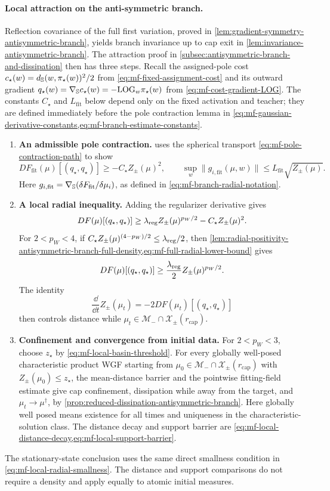 \paragraph{Local attraction on the anti-symmetric branch.}
Reflection covariance of the full first variation, proved in
\cref{lem:gradient-symmetry-antisymmetric-branch}, yields branch invariance
up to cap exit in \cref{lem:invariance-antisymmetric-branch}.
The attraction proof in
\cref{subsec:antisymmetric-branch-and-dissipation} then has three steps.
Recall the assigned-pole cost \(c_\star(w)=d_{\mathbb{S}}(w,\pi_\star(w))^2/2\)
from \cref{eq:mf-fixed-assignment-cost} and its outward gradient
\(q_\star(w)=\nabla_{\mathbb{S}} c_\star(w)=-\mathrm{LOG}_w\pi_\star(w)\) from
\cref{eq:mf-cost-gradient-LOG}.
The constants \(C_\star\) and \(L_{\mathrm{fit}}\) below depend only on the
fixed activation and teacher; they are defined immediately before the pole
contraction lemma in
\cref{eq:mf-gaussian-derivative-constants,eq:mf-branch-estimate-constants}.
\begin{enumerate}
 \item \textbf{An admissible pole contraction.}
  uses the spherical transport
 \cref{eq:mf-pole-contraction-path} to show
 \[
 DF_{\mathrm{fit}}(\mu)[(q_\star,q_\star)]\ge-C_\star Z_\pm(\mu)^2,
 \qquad \sup_w\|g_{i,\mathrm{fit}}(\mu,w)\|
                 \le L_{\mathrm{fit}}\sqrt{Z_\pm(\mu)}.
 \]
 Here \(g_{i,\mathrm{fit}}=\nabla_{\mathbb{S}}(\delta F_{\mathrm{fit}}/\delta\mu_i)\),
 as defined in \cref{eq:mf-branch-radial-notation}.
 \item \textbf{A local radial inequality.}
 Adding the regularizer derivative gives
 \[
 DF(\mu)[(q_\star,q_\star)]
 \ge\lambda_{\mathrm{reg}} Z_\pm(\mu)^{p_W/2}-C_\star Z_\pm(\mu)^2.
 \]
 For \(2<p_W<4\), if
 \(C_\star Z_\pm(\mu)^{(4-p_W)/2}\le\lambda_{\mathrm{reg}}/2\), then
 \cref{lem:radial-positivity-antisymmetric-branch-full-density,eq:mf-full-radial-lower-bound}
 gives
 \[
 DF(\mu)[(q_\star,q_\star)]
 \ge\frac{\lambda_{\mathrm{reg}}}{2}Z_\pm(\mu)^{p_W/2}.
 \]
 The identity
 \[
 \frac{\dd}{\dd t}Z_\pm(\mu_t)=-2DF(\mu_t)[(q_\star,q_\star)]
 \]
 then controls distance while \(\mu_t\in\mathcal M_-\cap
 \mathcal X_\pm(r_{\mathrm{cap}})\).
 \item \textbf{Confinement and convergence from initial data.}
 For \(2<p_W<3\), choose \(z_\star\) by
 \cref{eq:mf-local-basin-threshold}. For every globally well-posed
 characteristic product WGF starting from
 \(\mu_0\in\mathcal M_-\cap\mathcal X_\pm(r_{\mathrm{cap}})\) with
 \(Z_\pm(\mu_0)\le z_\star\), the mean-distance barrier and the pointwise
 fitting-field estimate give cap confinement, dissipation while away from the
 target, and \(\mu_t\to\mu^\dagger\), by
 \cref{prop:reduced-dissipation-antisymmetric-branch}.
 Here globally well posed means existence for all times and uniqueness in the
 characteristic-solution class.
 The distance decay and support barrier are
 \cref{eq:mf-local-distance-decay,eq:mf-local-support-barrier}.
\end{enumerate}
The stationary-state conclusion uses the same direct smallness condition in
\cref{eq:mf-local-radial-smallness}. The distance and support comparisons do
not require a density and apply equally to atomic initial measures.

